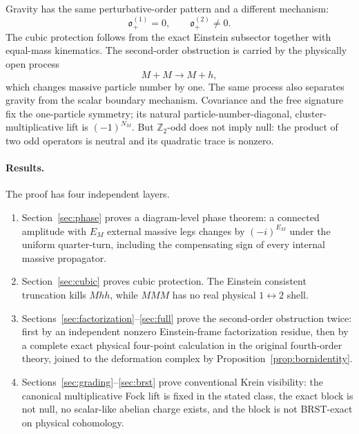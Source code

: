 \documentclass[11pt]{article}
\theoremstyle{definition}
\theoremstyle{remark}
\newcommand{\ob}{\mathfrak o}
\begin{document}
Gravity has the same perturbative-order pattern and a different
mechanism:
\begin{equation}\label{eq:pattern}
\boxed{\ob_+^{(1)}=0,\qquad \ob_+^{(2)}\ne0.}
\end{equation}
The cubic protection follows from the exact Einstein subsector together
with equal-mass kinematics.  The second-order obstruction is carried by
the physically open process
\begin{equation}\label{eq:process}
M+M\longrightarrow M+h,
\end{equation}
which changes massive particle number by one.  The same process also
separates gravity from the scalar boundary mechanism.  Covariance and
the free signature fix the one-particle symmetry; its natural
particle-number-diagonal, cluster-multiplicative lift is $(-1)^{N_M}$.
But $\mathbb Z_2$-odd does not imply null:
the product of two odd operators is neutral and its quadratic trace is
nonzero.

\paragraph{Results.}
The proof has four independent layers.
\begin{enumerate}
\item Section~\ref{sec:phase} proves a diagram-level phase theorem: a
connected amplitude with $E_M$ external massive legs changes by
$(-i)^{E_M}$ under the uniform quarter-turn, including the compensating
sign of every internal massive propagator.
\item Section~\ref{sec:cubic} proves cubic protection.  The Einstein
consistent truncation kills $Mhh$, while $MMM$ has no real physical
$1\leftrightarrow2$ shell.
\item Sections~\ref{sec:factorization}--\ref{sec:full} prove the
second-order obstruction twice: first by an independent nonzero
Einstein-frame factorization residue, then by a complete exact physical
four-point calculation in the original fourth-order theory, joined to
the deformation complex by Proposition~\ref{prop:bornidentity}.
\item Sections~\ref{sec:grading}--\ref{sec:brst} prove conventional
Krein visibility: the canonical multiplicative Fock lift is fixed in the
stated class, the exact block is not null, no scalar-like abelian charge
exists, and the block is not BRST-exact on physical cohomology.
\end{enumerate}
\end{document}

